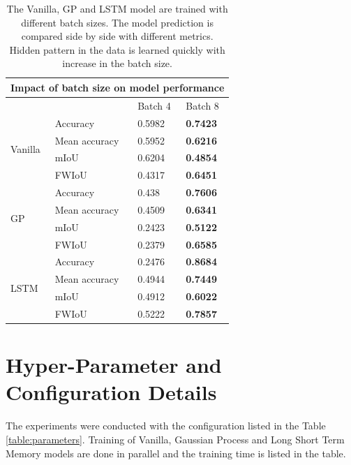 	
	\begin{table}
		\centering
		\begin{tabular}{|l|l|l|l|} 
			\hline
			\multicolumn{4}{|l|}{\textbf{Impact of batch size on model performance} }      \\ 
			\hline
			&               & Batch 4 & Batch 8          \\ 
			\hline
			\multirow{4}{*}{Vanilla} & Accuracy      & 0.5982  & \textbf{0.7423}  \\ 
			\cline{2-4}
			& Mean accuracy & 0.5952  & \textbf{0.6216}  \\ 
			\cline{2-4}
			& mIoU          & 0.6204  & \textbf{0.4854}  \\ 
			\cline{2-4}
			& FWIoU         & 0.4317  & \textbf{0.6451}  \\ 
			\hline
			\multirow{4}{*}{GP}      & Accuracy      & 0.438   & \textbf{0.7606}  \\ 
			\cline{2-4}
			& Mean accuracy & 0.4509  & \textbf{0.6341}  \\ 
			\cline{2-4}
			& mIoU          & 0.2423  & \textbf{0.5122}  \\ 
			\cline{2-4}
			& FWIoU         & 0.2379  & \textbf{0.6585}  \\ 
			\hline
			\multirow{4}{*}{LSTM}    & Accuracy      & 0.2476  & \textbf{0.8684}  \\ 
			\cline{2-4}
			& Mean accuracy & 0.4944  & \textbf{0.7449}  \\ 
			\cline{2-4}
			& mIoU          & 0.4912  & \textbf{0.6022}  \\ 
			\cline{2-4}
			& FWIoU         & 0.5222  & \textbf{0.7857}  \\
			\hline
		\end{tabular}
		\caption{The Vanilla, GP and LSTM model are trained with different batch sizes. The model prediction is compared side by side with different metrics. Hidden pattern in the data is learned quickly with increase in the batch size.}
	\label{table:hype3}
	\end{table}

	\newpage
	\section{Hyper-Parameter and Configuration Details }
	
	The experiments were conducted with the configuration listed in the Table \ref{table:parameters}. Training of Vanilla, Gaussian Process and Long Short Term Memory models are done in parallel and the training time is listed in the table.
	

